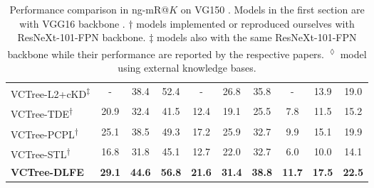 \documentclass[sigconf]{acmart}
\begin{document}
\begin{table*}[htbp]
{\begin{tabular}{l|c c c|c c c|c c c}
VCTree-L2+cKD\textsuperscript{$\ddagger$} \cite{DBLP:conf/bmvc/WangPL20} & - & 38.4 & 52.4 & - & 26.8 & 35.8 & - & 13.9 & 19.0 \\
VCTree-TDE\textsuperscript{$\dagger$} \cite{tang2020unbiased} & 20.9 & 32.4 & 41.5 & 12.4 & 19.1 & 25.5 & 7.8 & 11.5 & 15.2 \\
VCTree-PCPL\textsuperscript{$\dagger$} \cite{yan2020pcpl} & 25.1 & 38.5 & 49.3 & 17.2 & 25.9 & 32.7 & 9.9 & 15.1 & 19.9 \\
VCTree-STL\textsuperscript{$\dagger$} \cite{chen2019soft} & 16.8 & 31.8 & 45.1 & 12.7 & 22.0 & 32.7 & 6.0 & 10.0 & 14.1 \\
\textbf{VCTree-DLFE} & \textbf{29.1} & \textbf{44.6} & \textbf{56.8} & \textbf{21.6} & \textbf{31.4} & \textbf{38.8} & \textbf{11.7} & \textbf{17.5} & \textbf{22.5} \\
\hline
\end{tabular}
}
\vspace{0.3em}
\caption{Performance comparison in ng-mR@$K$ on VG150 \cite{krishna2017visual,xu2017scene}.
Models in the first section are with VGG16 backbone \cite{simonyan2014very}.
$\dagger$ models implemented or reproduced ourselves with ResNeXt-101-FPN \cite{lin2017feature} backbone.
$\ddagger$ models also with the same ResNeXt-101-FPN backbone while their performance are reported by the respective papers.
\textsuperscript{$\lozenge$} model using external knowledge bases.
}
\vspace{-1.5em}
\label{tab:sgg_ng_mr_result}
\end{table*}
\end{document}
